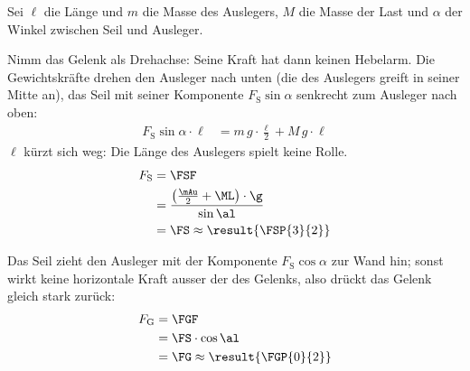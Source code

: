Sei $\ell$ die Länge und $m$ die Masse des Auslegers, $M$ die Masse der Last und $\alpha$ der Winkel zwischen Seil und Ausleger.

\begin{abcliste}
\abc
Nimm das Gelenk als Drehachse: Seine Kraft hat dann keinen Hebelarm. Die Gewichtskräfte drehen den Ausleger nach unten (die des Auslegers greift in seiner Mitte an), das Seil mit seiner Komponente $F_\mathrm{S}\sin\alpha$ senkrecht zum Ausleger nach oben:
\begin{align}
 F_\mathrm{S}\sin\alpha\cdot\ell &= m\,g\cdot\frac{\ell}{2} + M\,g\cdot\ell
\end{align}
$\ell$ kürzt sich weg: Die Länge des Auslegers spielt keine Rolle.
\begin{align}
 F_\mathrm{S} &= \FSF \\
   &= \frac{\left(\frac{\mAu}{2}+\ML\right)\cdot\g}{\sin\al} \\
   &= \FS \approx \result{\FSP{3}{2}}
\end{align}

\abc
Das Seil zieht den Ausleger mit der Komponente $F_\mathrm{S}\cos\alpha$ zur Wand hin; sonst wirkt keine horizontale Kraft ausser der des Gelenks, also drückt das Gelenk gleich stark zurück:
\begin{align}
 F_\mathrm{G} &= \FGF \\
   &= \FS\cdot\cos\al \\
   &= \FG \approx \result{\FGP{0}{2}}
\end{align}
\end{abcliste}
